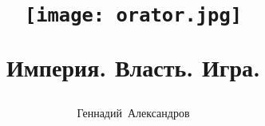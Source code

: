 \title{\begin{figure}\texttt{[image: orator.jpg]}\centering\end{figure}Империя. Власть. Игра.}
\author{Геннадий~Александров}
\date{}
\maketitle
